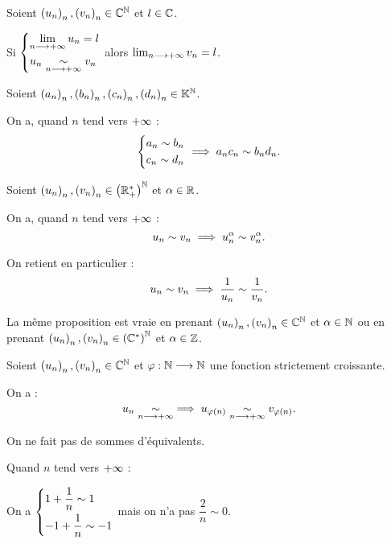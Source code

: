 \begin{prop}
Soient \(\left(u_n\right)_n,\left(v_n\right)_n\in\mathbb{C}^{\mathbb{N}}\) et \(l\in\mathbb{C}\).

Si \(\begin{dcases}
\lim_{n\longrightarrow+\infty}u_n=l \\
u_n\underset{n\longrightarrow+\infty}{\sim}v_n
\end{dcases}\) alors \(\lim_{n\longrightarrow+\infty}v_n=l\).
\end{prop}

\begin{prop}[Produits]
Soient \(\left(a_n\right)_n,\left(b_n\right)_n,\left(c_n\right)_n,\left(d_n\right)_n\in\mathbb{K}^{\mathbb{N}}\).

On a, quand \(n\) tend vers \(+\infty\) : \[\begin{dcases}
a_n\sim b_n \\
c_n\sim d_n
\end{dcases}\implies a_nc_n\sim b_nd_n.\]
\end{prop}

\begin{prop}[Puissances]
Soient \(\left(u_n\right)_n,\left(v_n\right)_n\in\left(\mathbb{R}_+^*\right)^{\mathbb{N}}\) et \(\alpha\in\mathbb{R}\).

On a, quand \(n\) tend vers \(+\infty\) : \[u_n\sim v_n\implies u_n^\alpha\sim v_n^\alpha.\]

On retient en particulier : \[u_n\sim v_n\implies\dfrac{1}{u_n}\sim\dfrac{1}{v_n}.\]

La même proposition est vraie en prenant \(\left(u_n\right)_n,\left(v_n\right)_n\in\mathbb{C}^{\mathbb{N}}\) et \(\alpha\in\mathbb{N}\) ou en prenant \(\left(u_n\right)_n,\left(v_n\right)_n\in\left(\mathbb{C}^*\right)^{\mathbb{N}}\) et \(\alpha\in\mathbb{Z}\).
\end{prop}

\begin{prop}
Soient \(\left(u_n\right)_n,\left(v_n\right)_n\in\mathbb{C}^{\mathbb{N}}\) et \(\varphi:\mathbb{N}\longrightarrow\mathbb{N}\) une fonction strictement croissante.

On a : \[u_n\underset{n\longrightarrow+\infty}{\sim}\implies u_{\varphi\left(n\right)}\underset{n\longrightarrow+\infty}{\sim}v_{\varphi\left(n\right)}.\]
\end{prop}

\begin{prop}[Sommes]
On ne fait pas de sommes d'équivalents.
\end{prop}

\begin{dem}
Quand \(n\) tend vers \(+\infty\) :

On a \(\begin{dcases}
1+\dfrac{1}{n}\sim1 \\
-1+\dfrac{1}{n}\sim-1
\end{dcases}\) mais on n'a pas \(\dfrac{2}{n}\sim0\).
\end{dem}

